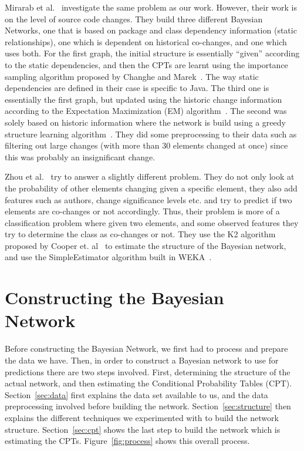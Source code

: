 \documentclass{article}
\begin{document}
Mirarab et al.~\cite{mirarab2007} investigate the same problem as our work. However, their work is on the level of source code changes. They build three
different Bayesian Networks, one that is based on package and class dependency information (static relationships), one which is dependent on historical
co-changes, and one which uses both. For the first graph, the initial structure is essentially ``given'' according to the static dependencies, and then the CPTs
are learnt using the importance sampling algorithm proposed by Changhe and Marek~\cite{yuan2003importance}. The way static dependencies are defined in their
case is specific to Java. The third one is essentially the first graph, but updated using the historic change information according to the Expectation
Maximization (EM) algorithm~\cite{dempster1977maximum}. The second was solely based on historic information where the network is build using a greedy structure
 learning algorithm~\cite{friedman1996learning}. They did some preprocessing to their data such as filtering out large changes (with more than 30 elements
changed at once) since this was probably an insignificant change.

Zhou et al.~\cite{zhou2008} try to answer a slightly different problem. They do not only look at the probability of other elements changing given a specific
element, they also add features such as authors, change significance levels etc. and try to predict if two elements are co-changes or not accordingly. Thus,
their problem is more of a classification problem where given two elements, and some observed features they try to determine the class as co-changes or not.
They use the K2 algorithm proposed by Cooper et. al~\cite{cooper1992bayesian} to estimate the structure of the Bayesian network, and use the SimpleEstimator
algorithm built in WEKA~\cite{witten2005data}.


\section{Constructing the Bayesian Network}
\label{sec:modelsused}

Before constructing the Bayesian Network, we first had to process and prepare the data we have. Then, in order to construct a Bayesian network to use for
predictions there are two steps involved. First, determining the structure of the actual network, and then estimating the Conditional Probability Tables
(CPT). Section~\ref{sec:data} first explains the data set available to us, and the data preprocessing involved before building the network.
Section~\ref{sec:structure} then explains the different techniques we experimented with to build the network structure. Section~\ref{sec:cpt} shows the last
step to build the network which is estimating the CPTs. Figure~\ref{fig:process} shows this overall process.
\end{document}
